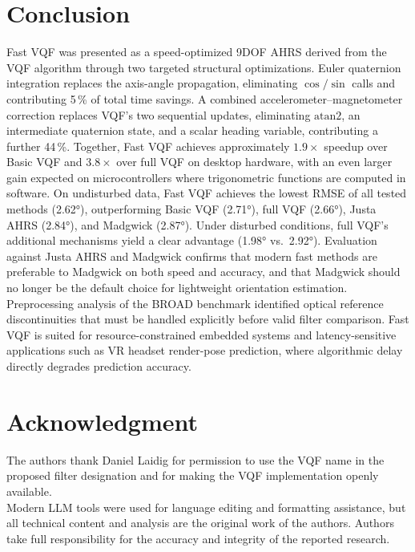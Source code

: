 \documentclass[conference]{IEEEtran}
\begin{document}
\section{Conclusion}

Fast VQF was presented as a speed-optimized 9DOF AHRS derived from the VQF algorithm through two targeted
structural optimizations. Euler quaternion integration replaces the axis-angle propagation, eliminating $\cos/\sin$
calls and contributing 5\,\% of total time savings. A combined accelerometer--magnetometer correction replaces
VQF's two sequential updates, eliminating $\mathrm{atan2}$, an intermediate quaternion state, and a scalar heading
variable, contributing a further 44\,\%. Together, Fast VQF achieves approximately $1.9\times$ speedup over Basic VQF
and $3.8\times$ over full VQF on desktop hardware, with an even larger gain expected on microcontrollers where
trigonometric functions are computed in software. On undisturbed data, Fast VQF achieves the lowest RMSE of all
tested methods (2.62°), outperforming Basic VQF (2.71°), full VQF (2.66°), Justa AHRS (2.84°), and Madgwick (2.87°).
Under disturbed conditions, full VQF's additional mechanisms yield a clear advantage (1.98° vs.\ 2.92°). Evaluation
against Justa AHRS and Madgwick confirms that modern fast methods are preferable to Madgwick on both speed and
accuracy, and that Madgwick should no longer be the default choice for lightweight orientation estimation.
Preprocessing analysis of the BROAD benchmark identified optical reference discontinuities that must be handled
explicitly before valid filter comparison. Fast VQF is suited for resource-constrained embedded systems and
latency-sensitive applications such as VR headset render-pose prediction, where algorithmic delay directly degrades
prediction accuracy.

\section*{Acknowledgment}
The authors thank Daniel Laidig for permission to use the VQF name in the proposed filter 
designation and for making the VQF implementation openly available.\\
Modern LLM tools were used for language editing and formatting assistance, but all technical content and analysis are the original work of the authors. Authors take full responsibility for the accuracy and integrity of the reported research.



\end{document}
